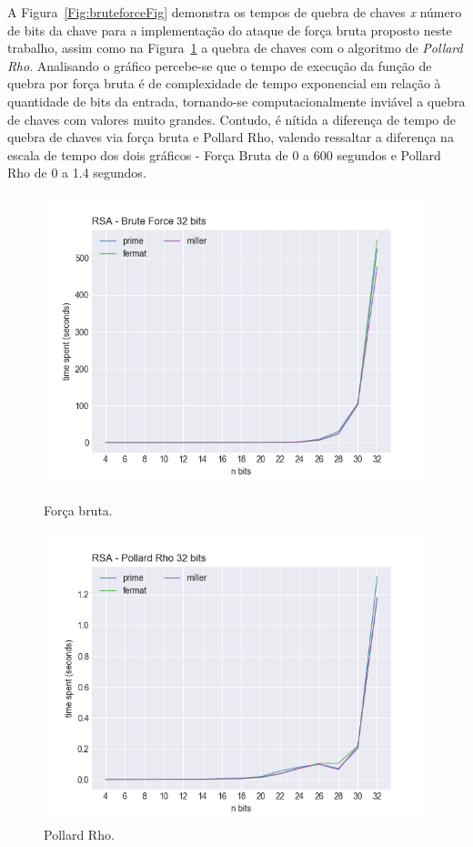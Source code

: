A Figura~\ref{Fig:bruteforceFig} demonstra os tempos de quebra de chaves \textit{x} número de bits da chave para a implementação do ataque de força bruta proposto neste trabalho, assim como na Figura~\ref{Fig:pollardFig} a quebra de chaves com o algoritmo de \textit{Pollard Rho}. Analisando o gráfico percebe-se que o tempo de execução da função de quebra por força bruta é de complexidade de tempo exponencial em relação à quantidade de bits da entrada, tornando-se computacionalmente inviável a quebra de chaves com valores muito grandes. Contudo, é nítida a diferença de tempo de quebra de chaves via força bruta e Pollard Rho, valendo ressaltar a diferença na escala de tempo dos dois gráficos - Força Bruta de 0 a 600 segundos e Pollard Rho de 0 a 1.4 segundos.

\begin{figure}[!htbp]
   \begin{minipage}{0.48\textwidth}
     \centering
     \includegraphics[width=1.1\linewidth]{images/32_BruteForce.png}
     \caption{Força bruta.}\label{Fig:bruteforceFig}
   \end{minipage}\hfill
   \begin{minipage}{0.48\textwidth}
     \centering
     \includegraphics[width=1.1\linewidth]{images/32_PollardRho.png}
     \caption{Pollard Rho.}\label{Fig:pollardFig}
   \end{minipage}
\end{figure}

